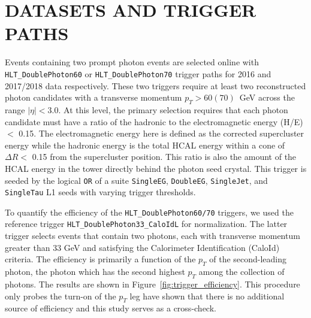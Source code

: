 \chapter{DATASETS AND TRIGGER PATHS}\label{ch:appendix_datasets_triggerpaths}
\RaggedRight \parindent=25pt
Events containing two prompt photon events are selected online with \texttt{HLT\_DoublePhoton60} or \texttt{HLT\_DoublePhoton70} trigger paths for 2016 and 2017/2018 data respectively. These two triggers require at least two reconstructed photon candidates with a transverse momentum $p_{T} > 60 (70)$~GeV across the range $|\eta| < 3.0$. At this level, the primary selection requires that each photon candidate must have a ratio of the hadronic to the electromagnetic energy (H/E) $<$ 0.15. The electromagnetic energy here is defined as the corrected supercluster energy while the hadronic energy is the total HCAL energy within a cone of $\Delta R <$  0.15 from the supercluster position. This ratio is also the amount of the HCAL energy in the tower directly behind the photon seed crystal. This trigger is seeded by the logical \texttt{OR} of a suite \texttt{SingleEG}, \texttt{DoubleEG}, \texttt{SingleJet}, and \texttt{SingleTau} L1 seeds with varying trigger thresholds. 


To quantify the efficiency of the \texttt{HLT\_DoublePhoton60/70} triggers, we used the reference trigger \texttt{HLT\_DoublePhoton33\_CaloIdL} for normalization. The latter trigger selects events that contain two photons, each with transverse momentum greater than 33 GeV and satisfying the Calorimeter Identification (CaloId) criteria. The efficiency is primarily a function of the $p_{T}$ of the second-leading photon, the photon which has the second highest $p_{T}$ among the collection of photons. The results are shown in Figure~\ref{fig:trigger_efficiency}. This procedure only probes the turn-on of the $p_{T}$ leg \cite{ref:AN2016_167} have shown that there is no additional source of efficiency and this study serves as a cross-check. 

